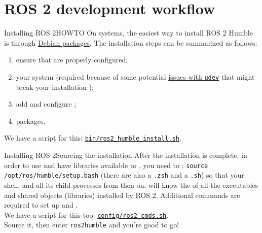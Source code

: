 
\section{ROS 2 development workflow}
\graphicspath{{figs/section1/}}

\begin{frame}{Installing ROS 2}{HOWTO}
  On  systems, the easiest way to install ROS 2 Humble is through \href{https://docs.ros.org/en/humble/Installation/Ubuntu-Install-Debians.html}{\color{blue}\underline{Debian packages}}.
  \newline\newline
  The installation steps can be summarized as follows:
  \begin{enumerate}
    \item ensure that  are properly configured;
    \item {} your system (required because of some potential \href{https://github.com/ros2/ros2/issues/1272}{\color{blue}\underline{issues with \texttt{udev}}} that might break your installation \smiley);
    \item add and configure ;
    \item {} packages.
  \end{enumerate}
  We have a script for this: \href{https://github.com/IntelligentSystemsLabUTV/ros2-examples/blob/humble/bin/ros2_humble_install.sh}{\color{blue}\underline{\texttt{bin/ros2\_humble\_install.sh}}}.
\end{frame}
\begin{frame}{Installing ROS 2}{Sourcing the installation}
  After the installation is complete, in order to use  and have libraries available to , you need to :
  \newline\newline
  \texttt{source /opt/ros/humble/setup.bash} (there are also a \texttt{.zsh} and a \texttt{.sh})
  \newline\newline
  so that your shell, and all its child processes from then on, will know the  of all the executables and shared objects (libraries) installed by ROS 2.
  \newline\newline
  Additional commands are required to set up  and .\\
  We have a script for this too: \href{https://github.com/IntelligentSystemsLabUTV/ros2-examples/blob/humble/config/ros2_cmds.sh}{\color{blue}\underline{\texttt{config/ros2\_cmds.sh}}}.\\
  Source it, then enter \texttt{ros2humble} and you're good to go!
\end{frame}

